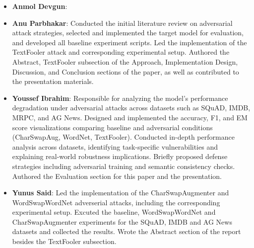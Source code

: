 \documentclass[conference]{IEEEtran}
\begin{document}
\begin{itemize}
    \item \textbf{Anmol Devgun}: 
    \item \textbf{Anu Parbhakar}: Conducted the initial literature review on adversarial attack strategies, selected and implemented the target model for evaluation, and developed all baseline experiment scripts. Led the implementation of the TextFooler attack and corresponding experimental setup. Authored the Abstract, TextFooler subsection of the Approach, Implementation Design, Discussion, and Conclusion sections of the paper, as well as contributed to the presentation materials.
 
    \item \textbf{Youssef Ibrahim}: Responsible for analyzing the model’s performance degradation under adversarial attacks across datasets such as SQuAD, IMDB, MRPC, and AG News. Designed and implemented the accuracy, F1, and EM score visualizations comparing baseline and adversarial conditions (CharSwapAug, WordNet, TextFooler). Conducted in-depth performance analysis across datasets, identifying task-specific vulnerabilities and explaining real-world robustness implications. Briefly proposed defense strategies including adversarial training and semantic consistency checks. Authored the Evaluation section for this paper and the presentation.

    \item \textbf{Yunus Said}: Led the implementation of the CharSwapAugmenter and WordSwapWordNet adverserial attacks, including the corresponding experimental setup. Excuted the baseline, WordSwapWordNet and CharSwapAugmenter experiments for the SQuAD, IMDB and AG News datasets and collected the results. Wrote the Abstract section of the report besides the TextFooler subsection.
\end{itemize}




\end{document}
